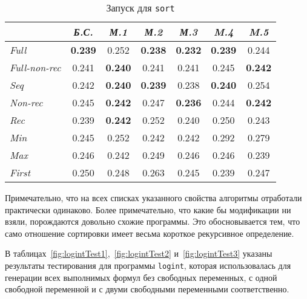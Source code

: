 \begin{table}[h!]

\center
\begin{tabular}{|l|c|c|c|c|c|c|}
\hline
                  &{\it Б.С.}&{\it М.1}&{\it М.2}&{\it М.3}&{\it M.4}&{\it M.5}\\ \hline
{\it Full        } & {\bf 0.239} & 0.252       & {\bf 0.238} & {\bf 0.232} & {\bf 0.239} & 0.244 \\ \hline
{\it Full-non-rec} & 0.241       & {\bf 0.240} & 0.241       & 0.241       & 0.245       & {\bf 0.242} \\ \hline
{\it Seq         } & 0.242       & {\bf 0.240} & {\bf 0.239} & 0.238       & {\bf 0.240} & 0.254 \\ \hline
{\it Non-rec     } & 0.245       & {\bf 0.242} & 0.247       & {\bf 0.236} & 0.244       & {\bf 0.242} \\ \hline
{\it Rec         } & 0.239       & {\bf 0.242} & 0.252       & 0.240       & 0.250       & 0.243 \\ \hline
{\it Min         } & 0.245       & 0.252       & 0.242       & 0.242       & 0.292       & 0.279 \\ \hline
{\it Max         } & 0.246       & 0.242       & 0.249       & 0.246       & 0.246       & 0.239 \\ \hline
{\it First       } & 0.250       & 0.248       & 0.263       & 0.245       & 0.239       & 0.247 \\ \hline


\end{tabular}
\caption{Запуск для \lstinline{sort}}
\label{fig:sortTest}
\end{table}

Примечательно, что на всех списках указанного свойства алгоритмы отработали практически
одинаково. Более примечательно, что какие бы модификации ни взяли,
порождаются довольно схожие программы. Это обосновывается тем, что само отношение
сортировки имеет весьма короткое рекурсивное определение.

В таблицах~\ref{fig:logintTest1},~\ref{fig:logintTest2} и~\ref{fig:logintTest3} указаны результаты тестирования для
программы \lstinline{logint}, которая использовалась для генерации всех выполнимых формул
без свободных переменных, с одной свободной переменной и с двуми свободными переменными соответственно.

